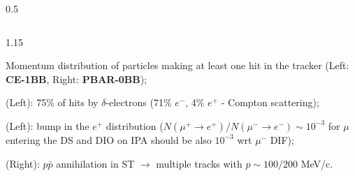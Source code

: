 \documentclass{beamer}
\begin{document}
\begin{frame}
\begin{columns}
\begin{column}{0.5\framewidth}
\begin{figure}[!h]
       \label{fig:momhits}
\end{figure}
        \end{column}
    \end{columns}
    \vspace{-3mm}
    \begin{columns}
        \begin{column}{1.15\framewidth}
    \setlength{\leftmargini}{1.2em}
    \begin{itemize}
    {\footnotesize
            \item Momentum distribution of particles making at least one hit in the tracker (Left: \textbf{CE-1BB}, Right: \textbf{PBAR-0BB});
            \vspace{2.5mm}
            \item (Left): 75\% of hits by $\delta$-electrons (71\% $e^-$, 4\% $e^+$ - Compton scattering);
              \vspace{2.5mm}
            \item (Left): bump in the $e^+$ distribution ($N(\mu^+ \rightarrow e^+ )/N(\mu^- \rightarrow e^-) \sim 10^{-3}$ for $\mu$ entering the DS and DIO on IPA should be also $10^{-3}$ wrt $\mu^-$ DIF);
              \vspace{2.5mm}
            \item  (Right): $p\bar{p}$ annihilation in ST $\rightarrow$ multiple tracks with $p \sim 100/200$ MeV/c.
          
}
           \end{itemize} 
        \end{column}
      
    \end{columns}
\end{frame}
\end{document}

